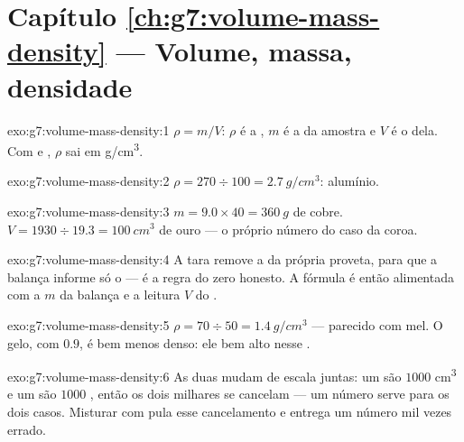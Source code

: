 \section*{Capítulo \ref{ch:g7:volume-mass-density} --- Volume, massa, densidade}

\begin{solution}{exo:g7:volume-mass-density:1}
$\rho = m/V$: $\rho$ é a , $m$ é a  da amostra e $V$ é
o  dela. Com  e , $\rho$ sai em
\unit{g/cm^3}.
\end{solution}

\begin{solution}{exo:g7:volume-mass-density:2}
$\rho = 270 \div 100 = \qty{2.7}{g/cm^3}$: alumínio.
\end{solution}

\begin{solution}{exo:g7:volume-mass-density:3}
$m = 9.0 \times 40 = \qty{360}{g}$ de cobre.
$V = 1930 \div 19.3 = \qty{100}{cm^3}$ de ouro --- o próprio número
do caso da coroa.
\end{solution}

\begin{solution}{exo:g7:volume-mass-density:4}
A tara remove a  da própria proveta, para que a balança informe
só o  --- é a regra do zero honesto. A fórmula é então
alimentada com a  $m$ da balança e a leitura $V$ do .
\end{solution}

\begin{solution}{exo:g7:volume-mass-density:5}
$\rho = 70 \div 50 = \qty{1.4}{g/cm^3}$ --- parecido com mel. O gelo,
com $0.9$, é bem menos denso: ele  bem alto nesse .
\end{solution}

\begin{solution}{exo:g7:volume-mass-density:6}
As duas  mudam de escala juntas: um  são $1000$
\unit{cm^3} e um  são $1000$ , então os dois milhares
se cancelam --- um número serve para os dois casos. Misturar 
com  pula esse cancelamento e entrega um número mil vezes
errado.
\end{solution}

